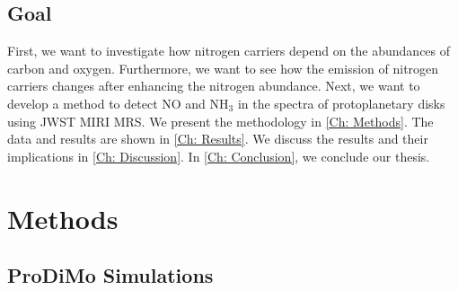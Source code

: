 \documentclass[twoside, single, authoryear, semicolon]{lion-msc}
\newcommand{\4}{$_4$}
\newcommand{\3}{$_3$}
\newcommand{\2}{$_2$}
\begin{document}
\section{Goal}
First, we want to investigate how nitrogen carriers depend on the abundances of carbon and oxygen. Furthermore, we want to see how the emission of nitrogen carriers changes after enhancing the nitrogen abundance. Next, we want to develop a method to detect NO and NH\3 in the spectra of protoplanetary disks using JWST MIRI MRS. 
We present the methodology in \autoref{Ch: Methods}. The data and results are shown in \autoref{Ch: Results}. We discuss the results and their implications in \autoref{Ch: Discussion}. In \autoref{Ch: Conclusion}, we conclude our thesis.
\chapter{Methods}\label{Ch: Methods}



\section{ProDiMo Simulations}
\end{document}

